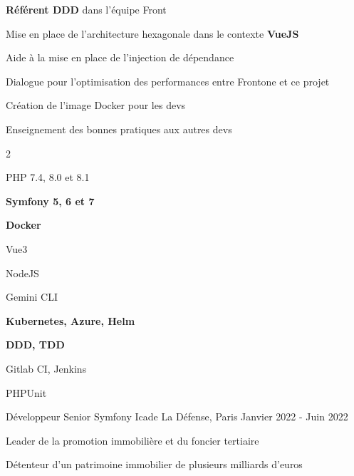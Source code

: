 \begin{cventries}
\begin{cvexperience}
		\begin{cvitems}
			\item {\textbf{Référent DDD} dans l'équipe Front}
			\item {Mise en place de l'architecture hexagonale dans le contexte \textbf{VueJS}}
			\item {Aide à la mise en place de l'injection de dépendance}
			\item {Dialogue pour l'optimisation des performances entre Frontone et ce projet}
			\item {Création de l'image Docker pour les devs}
			\item {Enseignement des bonnes pratiques aux autres devs}
		\end{cvitems}

		\vspace{-5mm}
		\begin{multicols}{2}
			\begin{cvitems}
				\item PHP 7.4, 8.0 et 8.1
				\item \textbf{Symfony 5, 6 et 7}
				\item \textbf{Docker}
				\item Vue3
				\item NodeJS
				\item Gemini CLI
				\item \textbf{Kubernetes, Azure, Helm}
				\item \textbf{DDD, TDD}
				\item Gitlab CI, Jenkins
				\item PHPUnit
			\end{cvitems}
		\end{multicols}
	\end{cvexperience}

	\begin{cvexperience}
		\cvbigentry
		{Développeur Senior Symfony} %
		{ Icade} %
		{La Défense, Paris} %
		{Janvier 2022 - Juin 2022} %
		{
			\vspace{2mm}
			\begin{cvitems} %
				\item {Leader de la promotion immobilière et du foncier tertiaire}
				\item {Détenteur d'un patrimoine immobilier de plusieurs milliards d'euros}
			\end{cvitems}
		}


\end{cvexperience}
\end{cventries}
